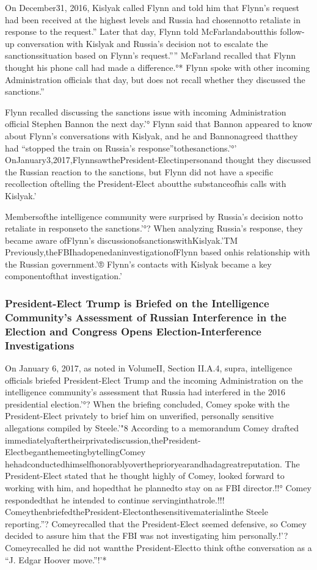 On December31, 2016, Kislyak called Flynn and told him that Flynn’s request had been received at the highest levels and Russia had chosennotto retaliate in response to the request.”
Later that day, Flynn told McFarlandaboutthis follow-up conversation with Kislyak and Russia’s decision not to escalate the sanctionssituation based on Flynn’s request.””
McFarland recalled that Flynn thought his phone call had made a difference.°*
Flynn spoke with other incoming Administration officials that day, but does not recall whether they discussed the sanctions.”

Flynn recalled discussing the sanctions issue with incoming Administration official Stephen Bannon the next day.'°
Flynn said that Bannon appeared to know about Flynn’s conversations with Kislyak, and he and Bannonagreed thatthey had “stopped the train on Russia’s response”tothesanctions.'°'
OnJanuary3,2017,FlynnsawthePresident-Electinpersonand thought they discussed the Russian reaction to the sanctions, but Flynn did not have a specific recollection oftelling the President-Elect aboutthe substanceofhis calls with Kislyak.'

Membersofthe intelligence community were surprised by Russia’s decision notto retaliate in responseto the sanctions.'°?
When analyzing Russia’s response, they became aware ofFlynn’s discussionofsanctionswithKislyak.'TM
Previously,theFBIhadopenedaninvestigationofFlynn based onhis relationship with the Russian government.'® Flynn’s contacts with Kislyak became a key componentofthat investigation.'

\subsubsection{President-Elect Trump is Briefed on the Intelligence Community's Assessment of Russian Interference in the Election and Congress Opens Election-Interference Investigations}

On January 6, 2017, as noted in VolumeII, Section II.A.4, supra, intelligence officials briefed President-Elect Trump and the incoming Administration on the intelligence community’s assessment that Russia had interfered in the 2016 presidential election.'°?
When the briefing concluded, Comey spoke with the President-Elect privately to brief him on unverified, personally sensitive allegations compiled by Steele.'"8
According to a memorandum Comey drafted immediatelyaftertheirprivatediscussion,thePresident-ElectbeganthemeetingbytellingComey hehadconductedhimselfhonorablyovertheprioryearandhadagreatreputation.
The President-Elect stated that he thought highly of Comey, looked forward to working with him, and hopedthat he plannedto stay on as FBI director.!!°
Comey respondedthat he intended to continue servinginthatrole.!!!
ComeythenbriefedthePresident-Electonthesensitivematerialinthe Steele reporting.''?
Comeyrecalled that the President-Elect seemed defensive, so Comey decided to assure him that the FBI was not investigating him personally.!'?
Comeyrecalled he did not wantthe President-Electto think ofthe conversation as a “J. Edgar Hoover move.”!'*

